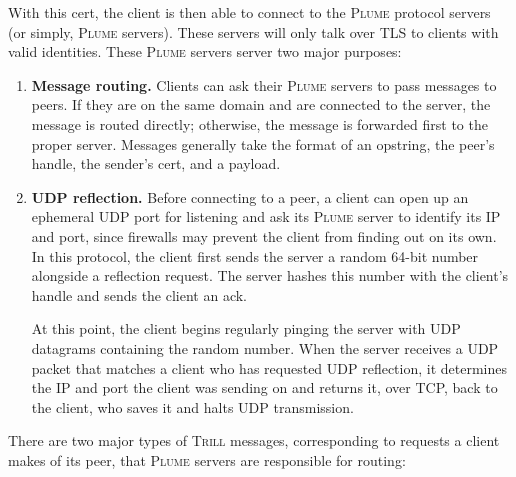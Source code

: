 \documentclass[11pt]{article}
\newcommand{\Trill}{\textsc{Trill}\xspace}
\newcommand{\Plume}{\textsc{Plume}\xspace}
\begin{document}
With this cert, the client is then able to connect to the \Plume protocol
servers (or simply, \Plume servers).  These servers will only talk over TLS to
clients with valid identities.  These \Plume servers server two major purposes:

\begin{enumerate}
  \item \textbf{Message routing.}  Clients can ask their \Plume servers to pass
    messages to peers.  If they are on the same domain and are connected to the
    server, the message is routed directly; otherwise, the message is forwarded
    first to the proper server.  Messages generally take the format of an
    opstring, the peer's handle, the sender's cert, and a payload.

  \item \textbf{UDP reflection.}  Before connecting to a peer, a client can
    open up an ephemeral UDP port for listening and ask its \Plume server to
    identify its IP and port, since firewalls may prevent the client from
    finding out on its own.  In this protocol, the client first sends the
    server a random 64-bit number alongside a reflection request.  The server
    hashes this number with the client's handle and sends the client an ack.

    At this point, the client begins regularly pinging the server with UDP
    datagrams containing the random number.  When the server receives a UDP
    packet that matches a client who has requested UDP reflection, it
    determines the IP and port the client was sending on and returns it, over
    TCP, back to the client, who saves it and halts UDP transmission.
\end{enumerate}

There are two major types of \Trill messages, corresponding to requests a
client makes of its peer, that \Plume servers are responsible for routing:
\end{document}
